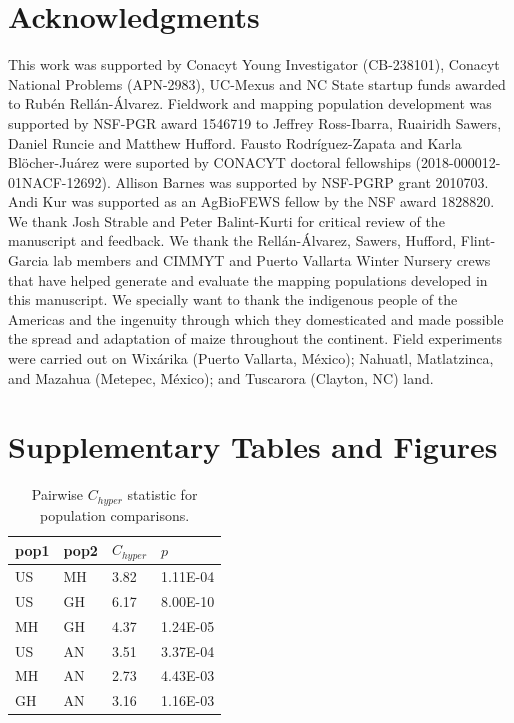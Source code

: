 \documentclass[9pt,twocolumn,twoside,lineno]{BioRxiv}
\begin{document}
\section{Acknowledgments}
This work was supported by Conacyt Young Investigator (CB-238101), Conacyt National Problems (APN-2983), UC-Mexus and NC State startup funds awarded to Rubén Rellán-Álvarez. 
Fieldwork and mapping population development was supported by NSF-PGR award 1546719 to Jeffrey Ross-Ibarra, Ruairidh Sawers, Daniel Runcie and Matthew Hufford.  
Fausto Rodríguez-Zapata and Karla Blöcher-Juárez were suported by CONACYT doctoral fellowships (2018-000012-01NACF-12692).
Allison Barnes was supported by NSF-PGRP grant 2010703. 
Andi Kur was supported as an AgBioFEWS fellow by the NSF award 1828820.
We thank Josh Strable and Peter Balint-Kurti for critical review of the manuscript and feedback. 
We thank the Rellán-Álvarez, Sawers, Hufford, Flint-Garcia lab members and CIMMYT and Puerto Vallarta Winter Nursery crews that have helped generate and evaluate the mapping populations developed in this manuscript.
We specially want to thank the indigenous people of the Americas and the  ingenuity through which they domesticated and made possible the spread and adaptation of maize throughout the continent. 
Field experiments were carried out on Wixárika (Puerto Vallarta, México); Nahuatl, Matlatzinca, and Mazahua (Metepec, México); and Tuscarora (Clayton, NC) land.
\label{sec:acknowledgments}



\clearpage

\onecolumn

\section*{Supplementary Tables and Figures}

\begin{table}[h!]

\begin{tabular}{@{}llll@{}}
\toprule
pop1 & pop2 & $C_{hyper}$   & $p$  \\ \midrule
US   & MH   & 3.82 & 1.11E-04 \\
US   & GH   & 6.17 & 8.00E-10 \\
MH   & GH   & 4.37 & 1.24E-05 \\
US   & AN   & 3.51 & 3.37E-04 \\
MH   & AN   & 2.73 & 4.43E-03 \\
GH   & AN   & 3.16 & 1.16E-03 \\ \bottomrule
\end{tabular}
\label{tab:table1}
\caption{Pairwise $C_{hyper}$ statistic for population comparisons.}
\end{table}
\end{document}
